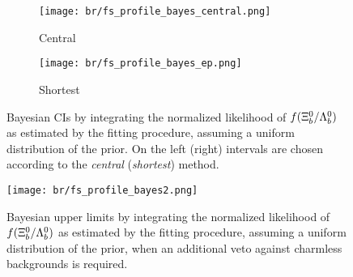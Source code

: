 \begin{figure}[htbp]
    \centering
    \begin{subfigure}{.49\textwidth}
        \centering
        \texttt{[image: br/fs\_profile\_bayes\_central.png]}
        \caption{Central}
    \end{subfigure}
    \begin{subfigure}{.49\textwidth}
        \centering
        \texttt{[image: br/fs\_profile\_bayes\_ep.png]}
        \caption{Shortest}
    \end{subfigure}
    \caption{Bayesian CIs by integrating the normalized likelihood of $f({{\Xi}^0_{b}}/{{\Lambda}^0_{b}})$ as estimated by the fitting procedure, assuming a uniform distribution of the prior. On the left (right) intervals are chosen according to the \textit{central} (\textit{shortest}) method.}
    \label{fig:apdx_brxiblb_bayesci}
\end{figure}

\begin{figure}[htbp]
    \centering
    \texttt{[image: br/fs\_profile\_bayes2.png]}
    \caption{Bayesian upper limits by integrating the normalized likelihood of $f({{\Xi}^0_{b}}/{{\Lambda}^0_{b}})$ as estimated by the fitting procedure, assuming a uniform distribution of the prior, when an additional veto against charmless \Xibz backgrounds is required.}
\end{figure}
